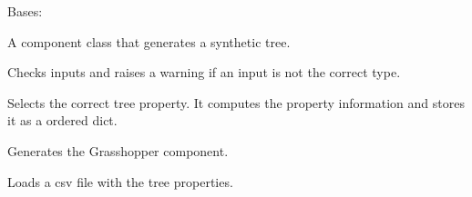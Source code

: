 \documentclass[letterpaper,10pt,english]{sphinxmanual}
\begin{document}
\begin{fulllineitems}
\label{\detokenize{cmf:livestock.components.comp_cmf.CMFSyntheticTree}}
Bases: {\hyperref[\detokenize{superclass:livestock.components.component.GHComponent}]{}}

A component class that generates a synthetic tree.

\begin{fulllineitems}
\label{\detokenize{cmf:livestock.components.comp_cmf.CMFSyntheticTree.check_inputs}}
Checks inputs and raises a warning if an input is not the correct type.

\end{fulllineitems}


\begin{fulllineitems}
\label{\detokenize{cmf:livestock.components.comp_cmf.CMFSyntheticTree.compute_tree}}
Selects the correct tree property. It computes the property information and stores it as a ordered dict.

\end{fulllineitems}


\begin{fulllineitems}
\label{\detokenize{cmf:livestock.components.comp_cmf.CMFSyntheticTree.config}}
Generates the Grasshopper component.

\end{fulllineitems}


\begin{fulllineitems}
\label{\detokenize{cmf:livestock.components.comp_cmf.CMFSyntheticTree.load_csv}}
Loads a csv file with the tree properties.

\end{fulllineitems}


\end{fulllineitems}
\end{document}

